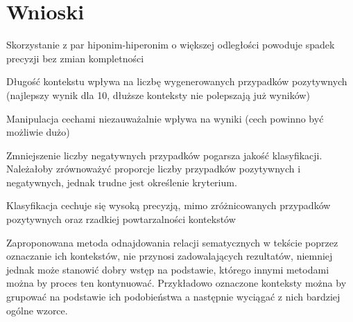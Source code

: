 \documentclass[a4paper,10pt]{report}
\begin{document}
\section{Wnioski}

Skorzystanie z par hiponim-hiperonim o większej odległości powoduje spadek precyzji bez zmian kompletności

Długość kontekstu wpływa na liczbę wygenerowanych przypadków pozytywnych (najlepszy wynik dla 10, dłuższe konteksty nie polepszają już wyników)

Manipulacja cechami niezauważalnie wpływa na wyniki (cech powinno być możliwie dużo)

Zmniejszenie liczby negatywnych przypadków pogarsza jakość klasyfikacji. Należałoby zrównoważyć proporcje liczby przypadków pozytywnych i negatywnych, jednak trudne jest określenie kryterium.


Klasyfikacja cechuje się wysoką precyzją, mimo zróżnicowanych przypadków pozytywnych oraz rzadkiej powtarzalności kontekstów

Zaproponowana metoda odnajdowania relacji sematycznych w tekście poprzez oznaczanie ich kontekstów, nie przynosi zadowalających rezultatów, niemniej jednak może stanowić dobry wstęp na podstawie, którego innymi metodami można by proces ten kontynuować. Przykładowo oznaczone konteksty można by grupować na podstawie ich podobieństwa a następnie wyciągać z nich bardziej ogólne wzorce.


\nocite{*}

\end{document}
